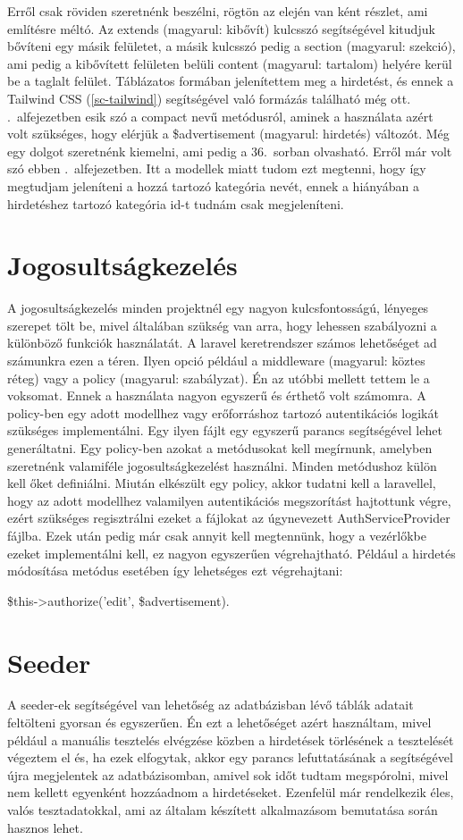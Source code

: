 \documentclass[]{thesis-ekf}
\theoremstyle{definition}
\theoremstyle{remark}
\begin{document}
		Erről csak röviden szeretnénk beszélni, rögtön az elején van ként részlet, ami említésre méltó. Az extends (magyarul: kibővít) kulcsszó segítségével kitudjuk bővíteni egy másik felületet, a másik kulcsszó pedig a section (magyarul: szekció), ami pedig a kibővített felületen belüli content (magyarul: tartalom) helyére kerül be a taglalt felület. Táblázatos formában jelenítettem meg a hirdetést, és ennek a Tailwind CSS (\ref{sc-tailwind}) segítségével való formázás található még ott. .~alfejezetben esik szó a compact nevű metódusról, aminek a használata azért volt szükséges, hogy elérjük a \$advertisement (magyarul: hirdetés) változót. Még egy dolgot szeretnénk kiemelni, ami pedig a 36.~sorban olvasható. Erről már volt szó ebben .~alfejezetben. Itt a modellek miatt tudom ezt megtenni, hogy így megtudjam jeleníteni a hozzá tartozó kategória nevét, ennek a hiányában a hirdetéshez tartozó kategória id-t tudnám csak megjeleníteni.
	\section{Jogosultságkezelés}
		A jogosultságkezelés minden projektnél egy nagyon kulcsfontosságú, lényeges szerepet tölt be, mivel általában szükség van arra, hogy lehessen szabályozni a különböző funkciók használatát. A laravel keretrendszer számos lehetőséget ad számunkra ezen a téren. Ilyen opció például a middleware (magyarul: köztes réteg) vagy a policy (magyarul: szabályzat). Én az utóbbi mellett tettem le a voksomat. Ennek a használata nagyon egyszerű és érthető volt számomra. A policy-ben egy adott modellhez vagy erőforráshoz tartozó autentikációs logikát szükséges implementálni. Egy ilyen fájlt egy egyszerű parancs segítségével lehet generáltatni. Egy policy-ben azokat a metódusokat kell megírnunk, amelyben szeretnénk valamiféle jogosultságkezelést használni. Minden metódushoz külön kell őket definiálni. Miután elkészült egy policy, akkor tudatni kell a laravellel, hogy az adott modellhez valamilyen autentikációs megszorítást hajtottunk végre, ezért szükséges regisztrálni ezeket a fájlokat az úgynevezett AuthServiceProvider fájlba. Ezek után pedig már csak annyit kell megtennünk, hogy a vezérlőkbe ezeket implementálni kell, ez nagyon egyszerűen végrehajtható. Például a hirdetés módosítása metódus esetében így lehetséges ezt végrehajtani: 
		\begin{center}
			\$this->authorize('edit', \$advertisement).
		\end{center}
		\cite{Laravel}
	\section{Seeder}
		A seeder-ek segítségével van lehetőség az adatbázisban lévő táblák adatait feltölteni gyorsan és egyszerűen. Én ezt a lehetőséget azért használtam, mivel például a manuális tesztelés elvégzése közben a hirdetések törlésének a tesztelését végeztem el és, ha ezek elfogytak, akkor egy parancs lefuttatásának a segítségével újra megjelentek az adatbázisomban, amivel sok időt tudtam megspórolni, mivel nem kellett egyenként hozzáadnom a hirdetéseket. Ezenfelül már rendelkezik éles, valós tesztadatokkal, ami az általam készített alkalmazásom bemutatása során hasznos lehet. 
	
\end{document}
